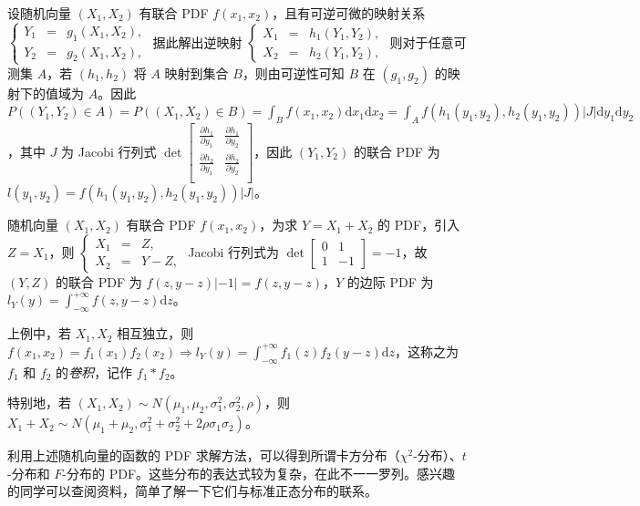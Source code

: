 \documentclass[../main.tex]{subfiles}
\begin{document}
设随机向量 $(X_1,X_2)$ 有联合 PDF $f(x_1,x_2)$，且有可逆可微的映射关系 $
    \left\{\begin{aligned}
        Y_1 & = & g_1(X_1,X_2), \\
        Y_2 & = & g_2(X_1,X_2),
    \end{aligned}\right.$ 据此解出逆映射 $
    \left\{\begin{aligned}
        X_1 & = & h_1(Y_1,Y_2), \\
        X_2 & = & h_2(Y_1,Y_2),
    \end{aligned}\right.$ 则对于任意可测集 $A$，若 $(h_1,h_2)$ 将 $A$ 映射到集合 $B$，则由可逆性可知 $B$ 在 $(g_1,g_2)$ 的映射下的值域为 $A$。因此 $P((Y_1,Y_2)\in A)=P((X_1,X_2)\in B)=\int_Bf(x_1,x_2)\mathrm dx_1\mathrm dx_2=\int_Af(h_1(y_1,y_2),h_2(y_1,y_2))|J|\mathrm dy_1\mathrm dy_2$，其中 $J$ 为 Jacobi 行列式 $
    \det \left[\begin{matrix}
            \frac{\partial h_1}{\partial y_1} & \frac{\partial h_1}{\partial y_2} \\
            \frac{\partial h_2}{\partial y_1} & \frac{\partial h_2}{\partial y_2} \\
        \end{matrix}\right]
$，因此 $(Y_1,Y_2)$ 的联合 PDF 为 $l(y_1,y_2)=f(h_1(y_1,y_2),h_2(y_1,y_2))|J|$。

\begin{example}
    随机向量 $(X_1,X_2)$ 有联合 PDF $f(x_1,x_2)$，为求 $Y=X_1+X_2$ 的 PDF，引入 $Z=X_1$，则 $
        \left\{\begin{aligned}
            X_1 & = & Z,   \\
            X_2 & = & Y-Z,
        \end{aligned}\right.$ Jacobi 行列式为 $
        \det \left[\begin{matrix}
                0 & 1  \\
                1 & -1
            \end{matrix}\right]=-1$，故 $(Y,Z)$ 的联合 PDF 为 $f(z,y-z)|-1|=f(z,y-z)$，$Y$ 的边际 PDF 为 $l_Y(y)=\int_{-\infty}^{+\infty}f(z,y-z)\mathrm dz$。
\end{example}

上例中，若 $X_1,X_2$ 相互独立，则 $f(x_1,x_2)=f_1(x_1)f_2(x_2)\Rightarrow l_Y(y)=\int_{-\infty}^{+\infty}f_1(z)f_2(y-z)\mathrm dz$，这称之为 $f_1$ 和 $f_2$ 的\emph{卷积}，记作 $f_1\ast f_2$。

特别地，若 $(X_1,X_2)\sim N(\mu_1,\mu_2,\sigma_1^2,\sigma_2^2,\rho)$，则 $X_1+X_2\sim N(\mu_1+\mu_2,\sigma_1^2+\sigma_2^2+2\rho\sigma_1\sigma_2)$。

利用上述随机向量的函数的 PDF 求解方法，可以得到所谓卡方分布（$\chi^2$-分布）、$t$-分布和 $F$-分布的 PDF。这些分布的表达式较为复杂，在此不一一罗列。感兴趣的同学可以查阅资料，简单了解一下它们与标准正态分布的联系。
\end{document}
